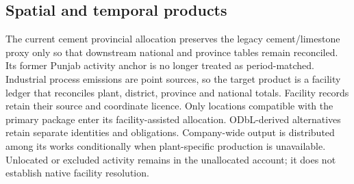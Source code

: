\subsection{Spatial and temporal products}

The current cement provincial allocation preserves the legacy cement/limestone proxy only so
that downstream national and province tables remain reconciled. Its former Punjab activity
anchor is no longer treated as period-matched. Industrial
process emissions are point sources, so the target product is a facility ledger that
reconciles plant, district, province and national totals. Facility records retain their source and coordinate licence. Only locations compatible with the primary package enter its facility-assisted allocation. ODbL-derived alternatives retain separate identities and obligations. Company-wide output is distributed among its works conditionally when plant-specific production is unavailable. Unlocated or excluded activity remains in the unallocated account; it does not establish native facility resolution.
